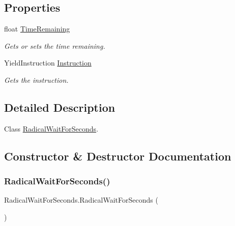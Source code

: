 \subsection*{Properties}
\begin{DoxyCompactItemize}
\item 
float \hyperlink{class_radical_wait_for_seconds_a748691ff223a1bdfba6514e04b8b12c6}{Time\+Remaining}
\begin{DoxyCompactList}\small\item\em Gets or sets the time remaining. \end{DoxyCompactList}\item 
Yield\+Instruction \hyperlink{class_radical_wait_for_seconds_af83ead2c5d678ce93fb5799798e1f4d0}{Instruction}
\begin{DoxyCompactList}\small\item\em Gets the instruction. \end{DoxyCompactList}\end{DoxyCompactItemize}


\subsection{Detailed Description}
Class \hyperlink{class_radical_wait_for_seconds}{Radical\+Wait\+For\+Seconds}. 



\subsection{Constructor \& Destructor Documentation}
\mbox{\label{class_radical_wait_for_seconds_a1703246c2cbb8f0b2c9eba55029d708c}} 
\subsubsection{\texorpdfstring{Radical\+Wait\+For\+Seconds()}{RadicalWaitForSeconds()}\hspace{0.1cm}{\footnotesize\ttfamily [1/2]}}
{\footnotesize\ttfamily Radical\+Wait\+For\+Seconds.\+Radical\+Wait\+For\+Seconds (\begin{DoxyParamCaption}{ }\end{DoxyParamCaption})\hspace{0.3cm}{\ttfamily [inline]}}




